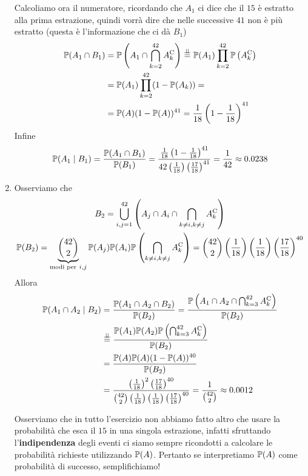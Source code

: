 \begin{enumerate}
	Calcoliamo ora il numeratore, ricordando che $A_{1}$ ci dice che il $15$ è estratto alla prima estrazione, quindi vorrà dire che nelle successive $41$ non è più estratto (questa è l'informazione che ci dà $B_{1}$)
	\begin{align*}
		\mathbb{P}(A_{1} \cap B_{1}) & =\mathbb{P}\left(A_{1} \cap \bigcap_{k=2}^{42} A_{k}^{\mathrm{C}}\right)\overset{\perp \!\!\! \perp }{=}\mathbb{P}(A_{1})\prod_{k=2}^{42}\mathbb{P}\left(A_{k}^{\mathrm{C}}\right)\\
		 & =\mathbb{P}(A_{1})\prod_{k=2}^{42}(1-\mathbb{P}(A_{k})) =\\
		 & =\mathbb{P}(A)(1-\mathbb{P}(A))^{41} =\frac{1}{18}\left(1-\frac{1}{18}\right)^{41}
	\end{align*}
	Infine
	\begin{equation*}
		\mathbb{P}(A_{1} \mid B_{1}) =\frac{\mathbb{P}(A_{1} \cap B_{1})}{\mathbb{P}(B_{1})} =\frac{\frac{1}{18}\left(1-\frac{1}{18}\right)^{41}}{42\left(\frac{1}{18}\right)\left(\frac{17}{18}\right)^{41}} =\frac{1}{42} \approx 0.0238
	\end{equation*}
	\item Osserviamo che
	\begin{gather*}
		B_{2} =\bigcup_{i,j=1}^{42}\left(A_{j} \cap A_{i} \cap \bigcap_{k\neq i,k\neq j} A_{k}\complementary\right)\\
		\PP(B_{2}) =\underbrace{\binom{42}{2}}_{\text{modi per} \ i,j}\PP(A_{j})\PP(A_{i})\PP\left(\bigcap_{k\neq i,k\neq j} A_{k}\complementary\right) =\binom{42}{2}\left(\frac{1}{18}\right)\left(\frac{1}{18}\right)\left(\frac{17}{18}\right)^{40}
	\end{gather*}
	Allora
	\begin{align*}
		\mathbb{P}(A_{1} \cap A_{2} \mid B_{2}) & =\frac{\mathbb{P}(A_{1} \cap A_{2} \cap B_{2})}{\mathbb{P}(B_{2})} =\frac{\mathbb{P}\left(A_{1} \cap A_{2} \cap \bigcap_{k=3}^{42} A_{k}^{\mathrm{C}}\right)}{\mathbb{P}(B_{2})}\\
		 & \overset{\perp \!\!\! \perp }{=}\frac{\mathbb{P}(A_{1})\mathbb{P}(A_{2})\mathbb{P}\left(\bigcap_{k=3}^{42} A_{k}^{\mathrm{C}}\right)}{\mathbb{P}(B_{2})}\\
		 & =\frac{\mathbb{P}(A)\mathbb{P}(A)(1-\mathbb{P}(A))^{40}}{\mathbb{P}(B_{2})}\\
		 & =\frac{\left(\frac{1}{18}\right)^{2}\left(\frac{17}{18}\right)^{40}}{\binom{42}{2}\left(\frac{1}{18}\right)\left(\frac{1}{18}\right)\left(\frac{17}{18}\right)^{40}} =\frac{1}{\binom{42}{2}} \approx 0.0012
	\end{align*}

	\begin{rem}
		Osserviamo che in tutto l'esercizio non abbiamo fatto altro che usare la probabilità che esca il $15$ in una singola estrazione, infatti sfruttando l'\textbf{indipendenza} degli eventi ci siamo sempre ricondotti a calcolare le probabilità richieste utilizzando $\mathbb{P}(A)$. Pertanto se interpretiamo $\mathbb{P}(A)$ come probabilità di successo, semplifichiamo!
	\end{rem}


\end{enumerate}
